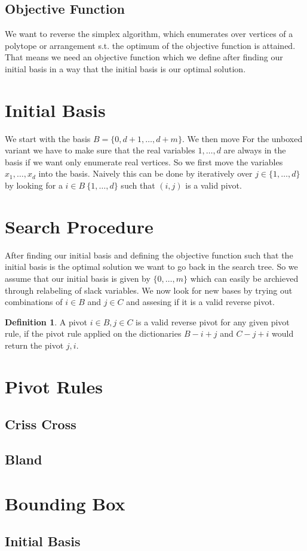 \documentclass[]{article}
\theoremstyle{definition}
\newtheorem{definition}{Definition}[section]
\theoremstyle{remark}
\begin{document}
\subsection{Objective Function}
We want to reverse the simplex algorithm, which enumerates over vertices of a polytope or arrangement s.t. the optimum of the objective function is attained. That means we need an objective function which we define after finding our initial basis in a way that the initial basis is our optimal solution.
\section{Initial Basis}
We start with the basis $B = \{0, d+1, \dots , d+m\}$. We then move For the unboxed variant we have to make sure that the real variables $1, \dots , d$ are always in the basis if we want only enumerate real vertices. So we first move the variables $x_1, \dots, x_d$ into the basis. Naively this can be done by iteratively over $j \in \{1,\dots ,d\}$ by looking for a $i \in B \ \{1,\dots,d\}$  such that  $(i,j)$ is a valid pivot.
\section{Search Procedure}
After finding our initial basis and defining the objective function such that the initial basis is the optimal solution we want to go back in the search tree. So we assume that our initial basis is given by $\{0, \dots, m\}$ which can easily be archieved through relabeling of slack variables. We now look for new bases by trying out combinations of $i \in B$ and $j \in C$ and assesing if it is a valid reverse pivot.
\begin{definition}
A pivot $i \in B, j \in C$  is a valid reverse pivot for any given pivot rule, if the pivot rule applied on the dictionaries $B - i + j$ and $C-j+i$ would return the pivot $j, i$.
\end{definition}
\section{Pivot Rules}
\subsection{Criss Cross}
\subsection{Bland}
\section{Bounding Box}
\subsection{Initial Basis}
\end{document}
